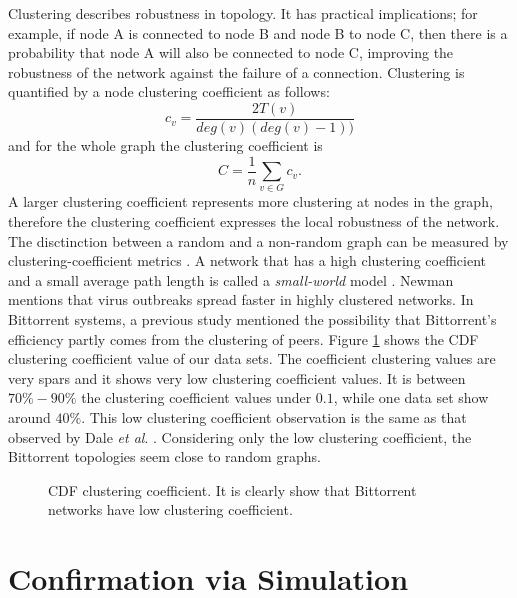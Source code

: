\documentclass[10pt,conference,letterpaper]{IEEEtran}
\begin{document}
Clustering describes robustness in topology. 
It has practical implications; for example, if node A is connected to node B and node B to node C, then there is a probability that node A will also be
connected to node C, improving the robustness of the network against the failure of a connection.  
Clustering is quantified by a node clustering coefficient as follows:
\begin{equation}
c_v = \frac{2T(v)}{deg(v) (deg(v)-1))}
\end{equation} 
and for the whole graph the clustering coefficient is
\begin{equation}
C = \frac{1}{n} \sum_{v \in G} c_v.
\end{equation}
A larger clustering coefficient represents more clustering at nodes in the graph, therefore the clustering coefficient expresses the local robustness of the network.
The disctinction between a random and a non-random graph can be measured by clustering-coefficient metrics \cite{watts1998collective}.
A network that has a high clustering coefficient and a small average path length is called a \textit{small-world} model \cite{watts1998collective}.
Newman \cite{newman2003properties} mentions that virus outbreaks spread faster in highly clustered networks. 
In Bittorrent systems, a previous study \cite{legout2007clustering} mentioned the possibility that Bittorrent's efficiency partly comes from the clustering of peers.
Figure \ref{fig:cdf-clustering} shows the CDF clustering coefficient value of our data sets.
The coefficient clustering values are very spars and it shows very low clustering coefficient values. 
It is between $70\% - 90\%$ the clustering coefficient values under $0.1$, while one data set show around $40\%$. 
This low clustering coefficient observation is the same as that observed by Dale \textit{et al}. \cite{dale2008evolution}.
Considering only the low clustering coefficient, the Bittorrent topologies seem close to random graphs.
\begin{figure}
\centering
{}
\caption{CDF clustering coefficient. It is clearly show that Bittorrent networks have low clustering coefficient.} 
\label{fig:cdf-clustering}
\end{figure}


\section{Confirmation via Simulation}\label{simulation}
\end{document}
